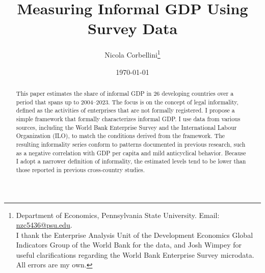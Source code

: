 \documentclass[letterpaper, 12pt]{article}
\author{Nicola Corbellini\thanks{\footnotesize Department of Economics, Pennsylvania State University. Email: \href{mailto:nzc5436@psu.edu}{nzc5436@psu.edu}. 
\\I thank the Enterprise Analysis Unit of the Development Economics Global Indicators Group of the World Bank for the data, and Josh Wimpey for useful clarifications regarding the World Bank Enterprise Survey microdata. All errors are my own.}}
\date{\today}
\title{Measuring Informal GDP Using Survey Data}
\begin{document}
\maketitle

\begin{abstract}
    \begin{singlespace}
    This paper estimates the share of informal GDP in 26 developing countries over a period that spans up to 2004–2023. The focus is on the concept of legal informality, defined as the activities of enterprises that are not formally registered. I propose a simple framework that formally characterizes informal GDP. I use data from various sources, including the World Bank Enterprise Survey and the International Labour Organization (ILO), to match the conditions derived from the framework. The resulting informality series conform to patterns documented in previous research, such as a negative correlation with GDP per capita and mild anticyclical behavior. Because I adopt a narrower definition of informality, the estimated levels tend to be lower than those reported in previous cross-country studies.
    \end{singlespace}
\end{abstract}

\end{document}
